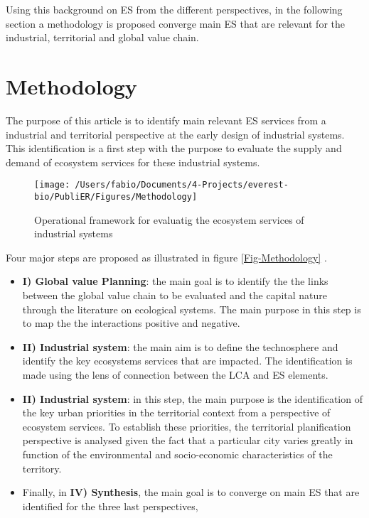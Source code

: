 \documentclass[]{elsarticle} %
\begin{document}
Using this background on ES from the different perspectives, in the following section a methodology is proposed converge main ES that are relevant for the industrial, territorial and global value chain.

\hypertarget{methodology}{%
\section{Methodology}\label{methodology}}

\label{methodology}

The purpose of this article is to identify main relevant ES services from a industrial and territorial perspective at the early design of industrial systems.
This identification is a first step with the purpose to evaluate the supply and demand of ecosystem services for these industrial systems.

\begin{figure}[!ht]

{\centering \texttt{[image: /Users/fabio/Documents/4-Projects/everest-bio/PubliER/Figures/Methodology]} 

}

\caption{Operational framework for evaluatig the ecosystem services of industrial systems}\label{fig:Fig-Methodology}
\end{figure}

Four major steps are proposed as illustrated in figure \ref{Fig-Methodology} .

\begin{itemize}
\item
  \textbf{I) Global value Planning}: the main goal is to identify the the links between the global value chain to be evaluated and the capital nature through the literature on ecological systems.
  The main purpose in this step is to map the the interactions positive and negative.
\item
  \textbf{II) Industrial system}: the main aim is to define the technosphere and identify the key ecosystems services that are impacted.
  The identification is made using the lens of connection between the LCA and ES elements.
\item
  \textbf{II) Industrial system}: in this step, the main purpose is the identification of the key urban priorities in the territorial context from a perspective of ecosystem services.
  To establish these priorities, the territorial planification perspective is analysed given the fact that a particular city varies greatly in function of the environmental and socio-economic characteristics of the territory.
\item
  Finally, in \textbf{IV) Synthesis}, the main goal is to converge on main ES that are identified for the three last perspectives,
\end{itemize}
\end{document}
